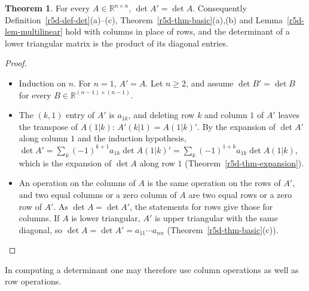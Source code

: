 \documentclass[12pt]{article}
\newcommand{\R}{\mathbb R}
\theoremstyle{definition}
\newtheorem{theorem}{Theorem}
\begin{document}
\begin{theorem}\label{r5d-thm-transpose}
For every \(A\in\R^{n\times n}\), \(\det A'=\det A\). Consequently Definition~\ref{r5d-def-det}(a)--(c),
Theorem~\ref{r5d-thm-basic}(a),(b) and Lemma~\ref{r5d-lem-multilinear} hold with columns in place of rows, and the
determinant of a lower triangular matrix is the product of its diagonal entries.
\end{theorem}
\begin{proof}
\begin{itemize}
\item Induction on \(n\). For \(n=1\), \(A'=A\). Let \(n\geqslant2\), and assume \(\det B'=\det B\) for every
\(B\in\R^{(n-1)\times(n-1)}\).
\item The \((k,1)\) entry of \(A'\) is \(a_{1k}\), and deleting row \(k\) and column \(1\) of \(A'\) leaves the transpose of
\(A(1|k)\): \(A'(k|1)=A(1|k)'\). By the expansion of \(\det A'\) along column \(1\) and the induction hypothesis,
\(\det A'=\sum_k(-1)^{k+1}a_{1k}\det A(1|k)'=\sum_k(-1)^{1+k}a_{1k}\det A(1|k)\), which is the expansion of \(\det A\) along
row \(1\) (Theorem~\ref{r5d-thm-expansion}).
\item An operation on the columns of \(A\) is the same operation on the rows of \(A'\), and two equal columns or a
zero column of \(A\) are two equal rows or a zero row of \(A'\). As \(\det A=\det A'\), the statements for rows
give those for columns. If \(A\) is lower triangular, \(A'\) is upper triangular with the same diagonal, so
\(\det A=\det A'=a_{11}\cdots a_{nn}\) (Theorem~\ref{r5d-thm-basic}(c)).\qedhere
\end{itemize}
\end{proof}
In computing a determinant one may therefore use column operations as well as row operations.
\end{document}
